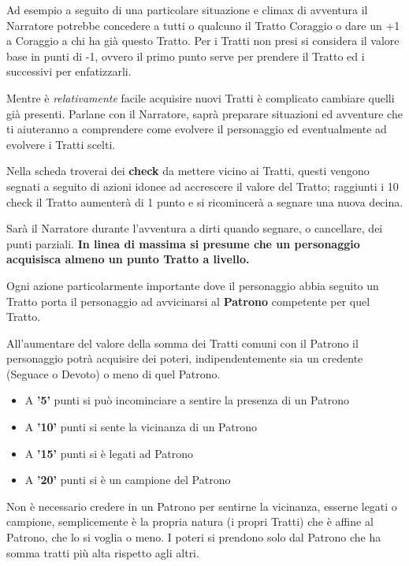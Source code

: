 \begin{multicols}{2}
Ad esempio a seguito di una particolare situazione e climax di avventura il Narratore potrebbe concedere a tutti o qualcuno il Tratto Coraggio o dare un +1 a Coraggio a chi ha già questo Tratto. Per i Tratti non presi si considera il valore base in punti di -1, ovvero il primo punto serve per prendere il Tratto ed i successivi per enfatizzarli.

Mentre è \emph{relativamente} facile acquisire nuovi Tratti è complicato cambiare quelli già presenti. Parlane con il Narratore, saprà preparare situazioni ed avventure che ti aiuteranno a comprendere come evolvere il personaggio ed eventualmente ad evolvere i Tratti scelti.

Nella scheda troverai dei \textbf{check} da mettere vicino ai Tratti, questi vengono segnati a seguito di azioni idonee ad accrescere il valore del Tratto; raggiunti i 10 check il Tratto aumenterà di 1 punto e si ricomincerà a segnare una nuova decina.

Sarà il Narratore durante l'avventura a dirti quando segnare, o cancellare, dei punti parziali. \textbf{In linea di massima si presume che un personaggio acquisisca almeno un punto Tratto a livello.}

Ogni azione particolarmente importante dove il personaggio abbia seguito un Tratto porta il personaggio ad avvicinarsi al \textbf{Patrono} competente per quel Tratto.

All'aumentare del valore della somma dei Tratti comuni con il Patrono il personaggio potrà acquisire dei poteri, indipendentemente sia un credente (Seguace o Devoto) o meno di quel Patrono.

\noindent\begin{itemize}[leftmargin=*] \setlength{\itemsep}{0pt}
\item A \textbf{'5'} punti si può incominciare a sentire la presenza di un Patrono

\item A \textbf{'10'} punti si sente la vicinanza di un Patrono

\item A \textbf{'15'} punti si è legati ad Patrono

\item A \textbf{'20'} punti si è un campione del Patrono
\end{itemize}

Non è necessario credere in un Patrono per sentirne la vicinanza, esserne legati o campione, semplicemente è la propria natura (i propri Tratti) che è affine al Patrono, che lo si voglia o meno. I poteri si prendono solo dal Patrono che ha somma tratti più alta rispetto agli altri.


\end{multicols}
